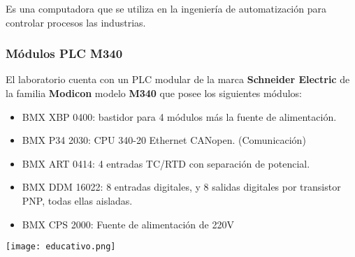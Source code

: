 \begin{tcolorbox}[colback=blue!5!white,colframe=blue!75!black,title=PLC]
	Es una computadora que se utiliza en la ingeniería de automatización para controlar procesos las industrias.
\end{tcolorbox}

\subsubsection{Módulos PLC M340}
El laboratorio cuenta con un PLC modular de la marca \textbf{Schneider Electric} de la familia \textbf{Modicon} modelo \textbf{M340} que posee los siguientes módulos:
\begin{itemize}
	\item BMX XBP 0400: bastidor para 4 módulos más la fuente de alimentación.
	\item BMX P34 2030: CPU 340-20 Ethernet CANopen.   (Comunicación)
	\item BMX ART 0414: 4 entradas TC/RTD con separación de potencial.
	\item BMX DDM 16022: 8 entradas digitales, y 8 salidas digitales por transistor PNP, todas ellas aisladas.
	\item BMX CPS 2000: Fuente de alimentación de 220V
\end{itemize}
\begin{center}
	\texttt{[image: educativo.png]}
\label{fig:didac}
\end{center}




